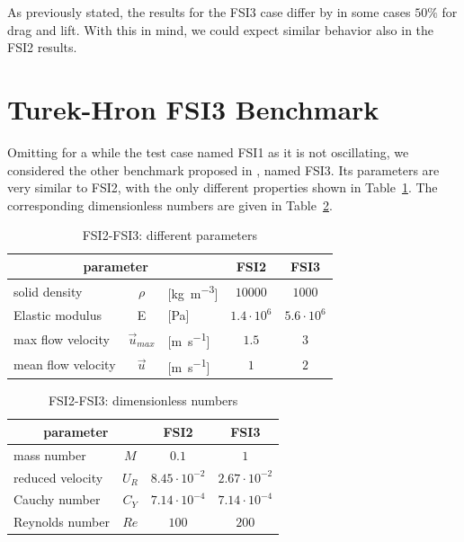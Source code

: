 As previously stated, the results for the FSI3 case differ by in some cases $50\%$ for drag and lift. With this in mind, we could expect similar behavior also in the FSI2 results.


\newpage


\section{Turek-Hron FSI3 Benchmark}
\label{sec:FSI1-FSI3}

Omitting for a while the test case named FSI1 as it is not oscillating, we considered the other benchmark proposed in \cite{turek2006proposal}, named FSI3. Its parameters are very similar to FSI2, with the only different properties shown in Table~\ref{table:FSI3-diff}. The corresponding dimensionless numbers are given in Table~\ref{table:FSI3-adim}. 



\begin{table}[!htb]
	\begin{center}
		\begin{tabular}{ l c l | c | c } 
			\multicolumn{3}{c|}{parameter} & FSI2 & FSI3   \\ 
			\hline
			solid density  &  $\rho$ & [\si{kg.m^{-3}}] & $10000$ & $1000$     \\
			Elastic modulus  & E & [\si{Pa}] & $1.4\cdot 10^6$ & $5.6\cdot 10^6$   \\
			max flow velocity & $\vec{u}_{max}$ & [\si{m.s^{-1}}] & $1.5$ & $3$ \\
			mean flow velocity & $\vec{u}$ & [\si{m.s^{-1}}] & $1$ & $2$  \\
		\end{tabular}
	\end{center}
	\caption{FSI2-FSI3: different parameters}
	\label{table:FSI3-diff}
\end{table}


\begin{table}[!htb]
	\begin{center}
		\begin{tabular}{ l c | c | c} 
			\multicolumn{2}{c|}{parameter} & FSI2 & FSI3   \\ 
			\hline
			mass number  & $M$ & $0.1$ & $1$     \\
			reduced velocity & $U_R$ &  $8.45 \cdot 10^{-2}$  & $2.67\cdot 10^{-2}$  \\
			Cauchy number  & $C_Y$ & \cellcolor{yellow!25}  $7.14\cdot 10^{-4}$  & \cellcolor{yellow!25} $7.14\cdot 10^{-4}$  \\
			Reynolds number & $Re$ & $100$ & $200$ \\	
		\end{tabular}
	\end{center}
	\caption{FSI2-FSI3: dimensionless numbers}
	\label{table:FSI3-adim}
\end{table}


